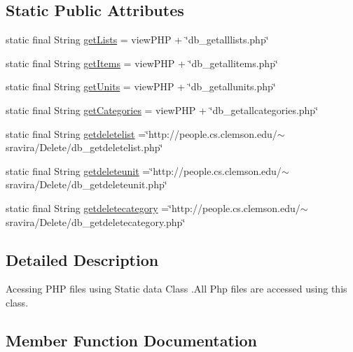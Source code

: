 \subsection*{Static Public Attributes}
\begin{DoxyCompactItemize}
\item 
static final String \hyperlink{classcom_1_1example_1_1santh_1_1shoppinglist_1_1_static_data_a92d144da22eec752791d44cee54099f4}{get\+Lists} = view\+P\+HP + \char`\"{}db\+\_\+getalllists.\+php\char`\"{}
\item 
static final String \hyperlink{classcom_1_1example_1_1santh_1_1shoppinglist_1_1_static_data_afd0845d4cf7cebc48b5bfa68b37e6b1a}{get\+Items} = view\+P\+HP + \char`\"{}db\+\_\+getallitems.\+php\char`\"{}
\item 
static final String \hyperlink{classcom_1_1example_1_1santh_1_1shoppinglist_1_1_static_data_a4ef15e32e18002772a06d568342642c7}{get\+Units} = view\+P\+HP + \char`\"{}db\+\_\+getallunits.\+php\char`\"{}
\item 
static final String \hyperlink{classcom_1_1example_1_1santh_1_1shoppinglist_1_1_static_data_a6526d7f1092c447e40d19b21f0dd2878}{get\+Categories} = view\+P\+HP + \char`\"{}db\+\_\+getallcategories.\+php\char`\"{}
\item 
static final String \hyperlink{classcom_1_1example_1_1santh_1_1shoppinglist_1_1_static_data_ac1c3487b59fa7dc543056e03103f9858}{getdeletelist} =\char`\"{}http\+://people.\+cs.\+clemson.\+edu/$\sim$sravira/Delete/db\+\_\+getdeletelist.\+php\char`\"{}
\item 
static final String \hyperlink{classcom_1_1example_1_1santh_1_1shoppinglist_1_1_static_data_ada7d599d828b29d17bcbfc8764d2f53a}{getdeleteunit} =\char`\"{}http\+://people.\+cs.\+clemson.\+edu/$\sim$sravira/Delete/db\+\_\+getdeleteunit.\+php\char`\"{}
\item 
static final String \hyperlink{classcom_1_1example_1_1santh_1_1shoppinglist_1_1_static_data_a1f83fd9c57993c3a15c4329b8b5eafc6}{getdeletecategory} =\char`\"{}http\+://people.\+cs.\+clemson.\+edu/$\sim$sravira/Delete/db\+\_\+getdeletecategory.\+php\char`\"{}
\end{DoxyCompactItemize}


\subsection{Detailed Description}
Acessing P\+HP files using Static data Class .All Php files are accessed using this class. 

\subsection{Member Function Documentation}
